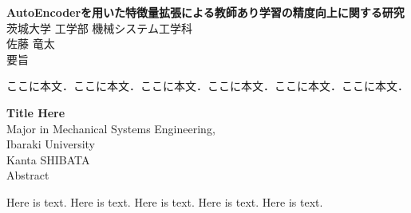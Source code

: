 \begin{center}
  \textbf{{\LARGE AutoEncoderを用いた特徴量拡張による教師あり学習の精度向上に関する研究\\}}
  \vspace{5mm}
  {\large 茨城大学 工学部 機械システム工学科\\
  佐藤 竜太\\}
  \vspace{5mm}
  {\large 要旨}
  \vspace{5mm}
\end{center}
ここに本文．ここに本文．ここに本文．ここに本文．ここに本文．ここに本文．

\newpage

\begin{center}
  \textbf{{\LARGE Title Here\\}}
  \vspace{5mm}
  {\large Major in Mechanical Systems Engineering,\\ Ibaraki University\\
  Kanta SHIBATA\\}
  \vspace{5mm}
  {\large Abstract}
  \vspace{5mm}
\end{center}
Here is text. Here is text. Here is text. Here is text. Here is text.
